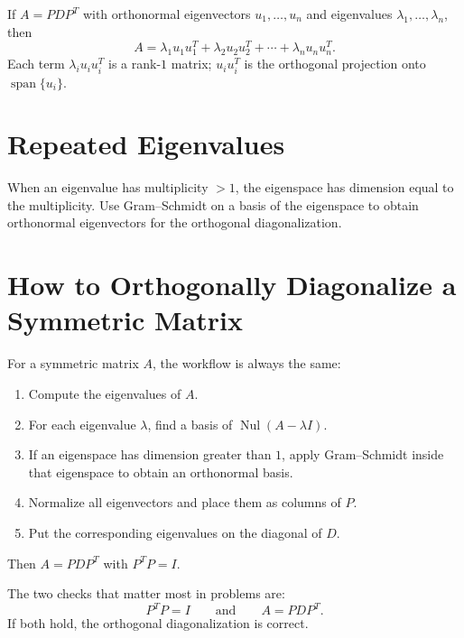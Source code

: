 If $A=PDP^T$ with orthonormal eigenvectors $u_1,\ldots,u_n$ and eigenvalues $\lambda_1,\ldots,\lambda_n$, then
\[
A = \lambda_1 u_1 u_1^T + \lambda_2 u_2 u_2^T + \cdots + \lambda_n u_n u_n^T.
\]
Each term $\lambda_i u_i u_i^T$ is a rank-$1$ matrix; $u_i u_i^T$ is the orthogonal projection onto $\operatorname{span}\{u_i\}$.

\section{Repeated Eigenvalues}

When an eigenvalue has multiplicity $>1$, the eigenspace has dimension equal to the multiplicity. Use Gram--Schmidt on a basis of the eigenspace to obtain orthonormal eigenvectors for the orthogonal diagonalization.

\section{How to Orthogonally Diagonalize a Symmetric Matrix}

For a symmetric matrix $A$, the workflow is always the same:
\begin{enumerate}
  \item Compute the eigenvalues of $A$.
  \item For each eigenvalue $\lambda$, find a basis of $\operatorname{Nul}(A-\lambda I)$.
  \item If an eigenspace has dimension greater than $1$, apply Gram--Schmidt inside that eigenspace to obtain an orthonormal basis.
  \item Normalize all eigenvectors and place them as columns of $P$.
  \item Put the corresponding eigenvalues on the diagonal of $D$.
\end{enumerate}
Then $A=PDP^T$ with $P^TP=I$.

\begin{remark}
The two checks that matter most in problems are:
\[
P^TP=I
\qquad \text{and} \qquad
A=PDP^T.
\]
If both hold, the orthogonal diagonalization is correct.
\end{remark}

